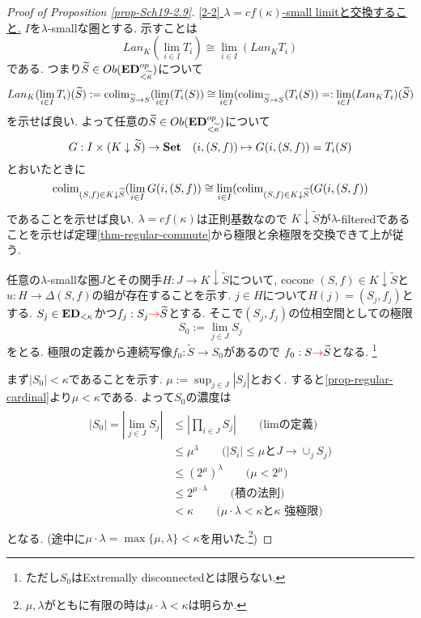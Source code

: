 \documentclass[dvipdfmx,a4paper,11pt]{article}
\newcommand{\colim}{{\rm colim}}
\theoremstyle{definition}
\newcommand{\xr}[1]{\textcolor{red}{#1}}
\begin{document}
\begin{proof}[Proof of Proposition \ref{prop-Sch19-2.9}]
\underline{[2-2] $\lambda=cf(\kappa)$-small limitと交換すること.}
$I$を$\lambda$-smallな圏とする.
示すことは
$$
Lan_{K}(\lim_{i \in I}T_{i})  \cong \lim_{i \in I}( Lan_{K} T_{i})
$$
である. つまり$\widetilde{S} \in Ob({\bf ED}_{<\widetilde{\kappa}}^{op})$について
$$
Lan_{K}(\lim_{i \in I}T_{i})(\widetilde{S} )
:=
\colim_{\widetilde{S} \to S} (\lim_{i \in I} (T_{i}(S) )
\cong
\lim_{i \in I}(\colim_{\widetilde{S} \to S} (T_{i} (S))
=:
\lim_{i \in I}( Lan_{K} T_{i})(\widetilde{S} )
$$
を示せば良い.
よって任意の$\widetilde{S} \in Ob({\bf ED}_{< \widetilde{\kappa}}^{op})$について
$$
G : I \times (K \downarrow \widetilde{S})
\to {\bf Set} 
\quad
(i,(S, f)) \mapsto G(i,(S, f))=T_{i}(S)
$$
とおいたときに
$$
\colim_{(S, f) \in K \downarrow \widetilde{S}}
 (\lim_{i \in I} G(i,(S, f))
\cong 
\lim_{i \in I}
(\colim_{(S, f) \in K \downarrow \widetilde{S}} ( G(i,(S, f))
$$
であることを示せば良い. 
$\lambda = cf(\kappa)$は正則基数なので
$K \downarrow \widetilde{S}$が$\lambda$-filteredであることを示せば定理\ref{thm-regular-commute}から極限と余極限を交換できて上が従う. 

任意の$\lambda$-smallな圏$J$とその関手$H : J \to K \downarrow \widetilde{S}$について, cocone $(S,f) \in K \downarrow \widetilde{S}$と$u : H \to \Delta (S,f)$の組が存在することを示す.
$j \in H$について$H(j) = (S_j,f_j)$とする. 
$S_j \in {\bf ED}_{<\kappa}$かつ$f_j :  S_{j} \xr{\to} \widetilde{S}$とする.
そこで$(S_j,f_j)$の位相空間としての極限
$$
S_0 := \lim_{j \in J}S_j
$$
をとる. 
極限の定義から連続写像$f_0 : \widetilde{S} \to S_0$があるので
$f_0 : S \xr{\to} \widetilde{S}$となる. \footnote{ただし$S_0$はExtremally disconnectedとは限らない.}

まず$|S_0| < \kappa$であることを示す.
$\mu := \sup_{j \in J} |S_j|$とおく. 
すると\ref{prop-regular-cardinal}より$\mu < \kappa$である.
よって$S_0$の濃度は
\begin{align*}
\begin{split}
|S_0| = | \lim_{j \in J} S_j| 
&\le |\prod_{i \in J} S_j|   \quad\quad \text{(limの定義)}\\
&\le \mu^{\lambda} \quad\quad \text{($|S_i| \le \mu$と$J \to \cup_{j}S_j$)}\\
&\le (2^{\mu})^{\lambda} \quad\quad \text{($\mu < 2^{\mu}$)}\\
&\le 2^{\mu \cdot \lambda}\quad\quad \text{(積の法則)}\\
&< \kappa \quad\quad \text{($\mu \cdot \lambda < \kappa$と$\kappa$ 強極限)}\\
\end{split}
\end{align*}
となる. (途中に$\mu \cdot \lambda =\max \{\mu, \lambda \} < \kappa$を用いた.\footnote{$\mu,  \lambda $がともに有限の時は$\mu \cdot \lambda < \kappa$は明らか. })


\end{proof}
\end{document}
